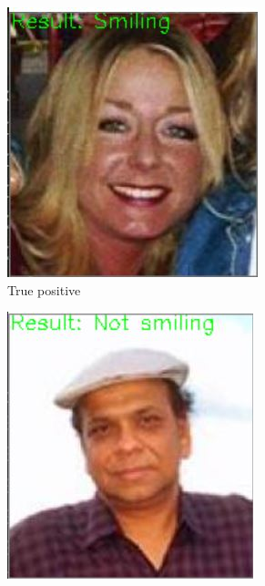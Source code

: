 \documentclass{article}
\begin{document}
\begin{figure}[t]
  \begin{minipage}[t]{0.5\textwidth}\centering
    \begin{subfigure}[t]{0.5\linewidth}\centering
      \includegraphics[width=0.95\linewidth]{figures/example1.jpg}
      \caption{True positive}
    \end{subfigure}%
    \begin{subfigure}[t]{0.5\linewidth}\centering
      \includegraphics[width=0.95\linewidth]{figures/example2.jpg}

\end{subfigure}
\end{minipage}
\end{figure}
\end{document}
